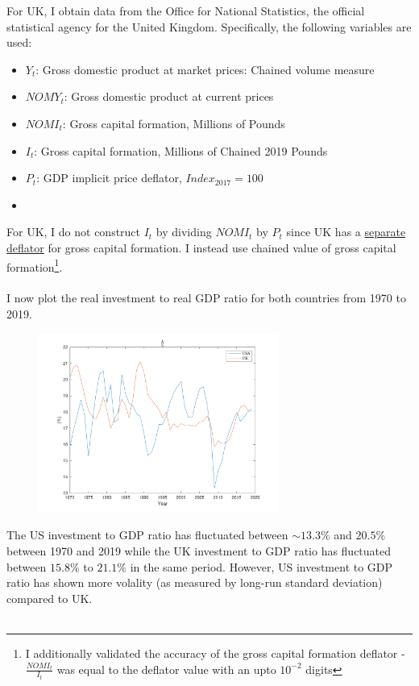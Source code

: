 \documentclass[11pt]{article}
\theoremstyle{mytheoremstyle}
\theoremstyle{mytheoremstyle}
\theoremstyle{myproblemstyle}
\begin{document}
For UK, I obtain data from the Office for National Statistics, the official statistical agency for the United Kingdom. Specifically, the following variables are used: 

\begin{itemize}
    \item $Y_t$: Gross domestic product at market prices: Chained volume measure
    \item $NOMY_t$:  Gross domestic product at current prices
    \item $NOMI_t$: Gross capital formation, Millions of Pounds
    \item $I_t$: Gross capital formation, Millions of Chained 2019 Pounds
    \item $P_t$: GDP implicit price deflator, $Index_{2017} = 100$
    \item 
\end{itemize}

\noindent For UK, I do not construct $I_t$ by dividing $NOMI_t$ by $P_t$ since UK has a \href{https://www.ons.gov.uk/economy/grossdomesticproductgdp/timeseries/ybfu/ukea}{separate deflator} for gross capital formation. I instead use chained value of gross capital formation\footnote{I additionally validated the accuracy of the gross capital formation deflator - $\frac{NOMI_t}{I_t}$ was equal to the deflator value with an upto $10^{-2}$ digits}.
\\ \\ 

\noindent I now plot the real investment to real GDP ratio for both countries from 1970 to 2019.

\begin{figure}[ht]
    \includegraphics[width=0.7\textwidth]{out/Investment.pdf}
    \centering
\end{figure}

The US investment to GDP ratio has fluctuated between $\sim 13.3\% $ and $20.5\%$ between 1970 and 2019 while the UK investment to GDP ratio has fluctuated between $15.8\%$ to $21.1\%$ in the same period. However, US investment to GDP ratio has shown more volality (as measured by long-run standard deviation) compared to UK.
\\
\\
\end{document}
